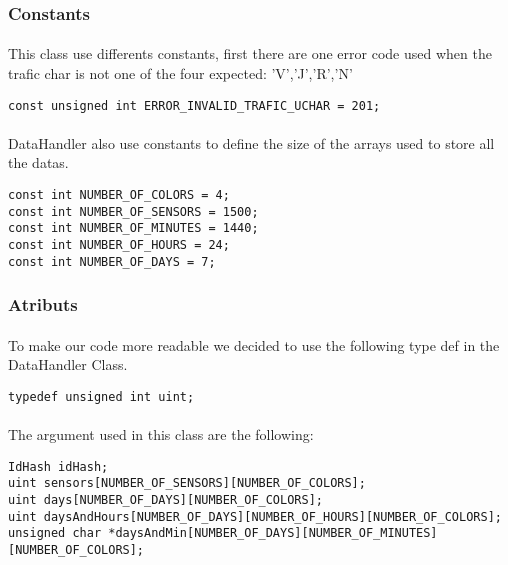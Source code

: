 \documentclass[a4paper, 12pts]{article}
\begin{document}
\subsubsection{Constants}

\paragraph{}
	This class use differents constants, first there are one error code used when the trafic char is not one of the four expected: 'V','J','R','N'

\begin{lstlisting}
const unsigned int ERROR_INVALID_TRAFIC_UCHAR = 201;
\end{lstlisting}

\paragraph{}
	DataHandler also use constants to define the size of the arrays used to store all the datas.

\begin{lstlisting}
const int NUMBER_OF_COLORS = 4;
const int NUMBER_OF_SENSORS = 1500;
const int NUMBER_OF_MINUTES = 1440;
const int NUMBER_OF_HOURS = 24;
const int NUMBER_OF_DAYS = 7;
\end{lstlisting}

\subsubsection{Atributs}
\paragraph{}
	To make our code more readable we decided to use the following type def in the DataHandler Class.
\begin{lstlisting}
typedef unsigned int uint;
\end{lstlisting}

\paragraph{}
	The argument used in this class are the following:
\begin{lstlisting}
IdHash idHash;
uint sensors[NUMBER_OF_SENSORS][NUMBER_OF_COLORS];
uint days[NUMBER_OF_DAYS][NUMBER_OF_COLORS];
uint daysAndHours[NUMBER_OF_DAYS][NUMBER_OF_HOURS][NUMBER_OF_COLORS];
unsigned char *daysAndMin[NUMBER_OF_DAYS][NUMBER_OF_MINUTES][NUMBER_OF_COLORS];
\end{lstlisting}
\end{document}
